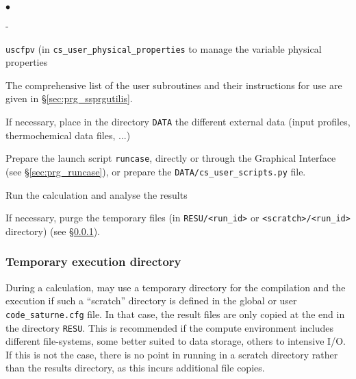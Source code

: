 {{{\begin{list}{$\bullet$}{}
\begin{list}{}{}
\begin{list}{}{}
\begin{list}{-}{}

           \item \texttt{uscfpv} (in \texttt{cs\_user\_physical\_properties}
                  to manage the variable physical properties

        \end{list}
    \end{list}

\end{list}


The comprehensive list of the user subroutines and their instructions
      for use are given in \S\ref{sec:prg_ssprgutilis}.

\item If necessary, place in the directory \texttt{DATA} the different
      external data (input profiles, thermochemical data files, ...)

\item Prepare the launch script \texttt{runcase}, directly or through the
      Graphical Interface (see \S\ref{sec:prg_runcase}), or prepare the
      \texttt{DATA/cs\_user\_scripts.py} file.

\item Run the calculation and analyse the results

\item If necessary, purge the temporary files (in \texttt{RESU/<run\_id>} or
      \texttt{<scratch>/<run\_id>} directory) (see \S\ref{sec:prg_temporarydirectory}).
\end{list}


\subsubsection{Temporary execution directory}
\label{sec:prg_temporarydirectory}%
During a calculation, \CS may use a temporary directory for the compilation and
the execution if such a ``scratch'' directory is defined in the global or user
\texttt{code\_saturne.cfg} file. In that case, the result files are only copied
at the end in the directory \texttt{RESU}. This is recommended if the compute
environment includes different file-systems, some better suited to data storage,
others to intensive I/O.
If this is not the case, there is no point in running in a scratch directory
rather than the results directory, as this incurs additional file copies.

}}}
